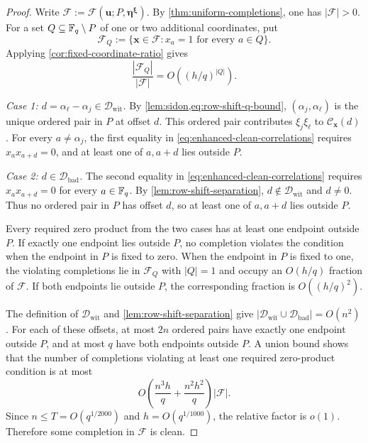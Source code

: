 \begin{proof}
Write
$\mathcal F:=\mathcal F(\mathbf u;P,\boldsymbol\eta^{\boldsymbol\xi})$.  By
\cref{thm:uniform-completions}, one has $|\mathcal F|>0$.
For a set $Q\subseteq\mathbb F_q\setminus P$ of one or two additional
coordinates, put
\[
 \mathcal F_Q:=\{\mathbf x\in\mathcal F:x_a=1
 \text{ for every }a\in Q\}.
\]
Applying \cref{cor:fixed-coordinate-ratio} gives
\[
 \frac{|\mathcal F_Q|}{|\mathcal F|}
 =O((h/q)^{|Q|}).
\]

\smallskip
\noindent\emph{Case 1: $d=\alpha_\ell-\alpha_j\in\mathcal D_{\mathrm{wit}}$.}
By \cref{lem:sidon,eq:row-shift-q-bound},
$(\alpha_j,\alpha_\ell)$ is the unique ordered pair in $P$ at offset $d$.
This ordered pair contributes $\xi_j\xi_\ell$ to
$\mathcal C_{\mathbf x}(d)$.  For every $a\ne\alpha_j$, the
first equality in \cref{eq:enhanced-clean-correlations} requires
$x_ax_{a+d}=0$, and at least one of $a,a+d$ lies outside $P$.

\smallskip
\noindent\emph{Case 2: $d\in\mathcal D_{\mathrm{bad}}$.}
The second equality in \cref{eq:enhanced-clean-correlations}
requires $x_ax_{a+d}=0$ for every $a\in\mathbb F_q$.
By \cref{lem:row-shift-separation}, $d\notin\mathcal D_{\mathrm{wit}}$ and
$d\ne0$.  Thus no ordered pair in $P$ has offset $d$, so at least one of
$a,a+d$ lies outside $P$.

Every required zero product from the two cases has at least one endpoint
outside $P$.  If exactly one endpoint lies outside $P$, no completion
violates the condition when the endpoint in $P$ is fixed to zero.  When
the endpoint in $P$ is fixed to one, the violating completions lie in
$\mathcal F_Q$ with $|Q|=1$ and occupy an
$O(h/q)$ fraction of $\mathcal F$.  If both endpoints lie outside $P$, the
corresponding fraction is $O((h/q)^2)$.

The definition of $\mathcal D_{\mathrm{wit}}$ and
\cref{lem:row-shift-separation} give
$|\mathcal D_{\mathrm{wit}}\cup\mathcal D_{\mathrm{bad}}|=O(n^2)$.  For each
of these offsets, at most $2n$ ordered pairs have exactly one endpoint outside
$P$, and at most $q$ have both endpoints outside $P$.  A union bound shows
that the number of completions violating at least one required zero-product
condition is at most
\[
 O\left(\frac{n^3h}{q}+\frac{n^2h^2}{q}\right)|\mathcal F|.
\]
Since $n\le T=O(q^{1/2000})$ and $h=O(q^{1/1000})$, the relative factor is
$o(1)$.  Therefore some completion in $\mathcal F$ is clean.
\end{proof}


